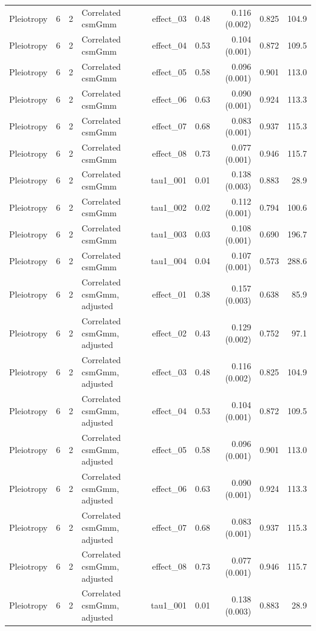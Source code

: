 \begin{longtable}{lcclrrrrr}
Pleiotropy & 6 & 2 & Correlated csmGmm & effect\_03 & 0.48 & 0.116 (0.002) & 0.825 & 104.9\\
Pleiotropy & 6 & 2 & Correlated csmGmm & effect\_04 & 0.53 & 0.104 (0.001) & 0.872 & 109.5\\
Pleiotropy & 6 & 2 & Correlated csmGmm & effect\_05 & 0.58 & 0.096 (0.001) & 0.901 & 113.0\\
Pleiotropy & 6 & 2 & Correlated csmGmm & effect\_06 & 0.63 & 0.090 (0.001) & 0.924 & 113.3\\
Pleiotropy & 6 & 2 & Correlated csmGmm & effect\_07 & 0.68 & 0.083 (0.001) & 0.937 & 115.3\\
Pleiotropy & 6 & 2 & Correlated csmGmm & effect\_08 & 0.73 & 0.077 (0.001) & 0.946 & 115.7\\
Pleiotropy & 6 & 2 & Correlated csmGmm & tau1\_001 & 0.01 & 0.138 (0.003) & 0.883 & 28.9\\
Pleiotropy & 6 & 2 & Correlated csmGmm & tau1\_002 & 0.02 & 0.112 (0.001) & 0.794 & 100.6\\
Pleiotropy & 6 & 2 & Correlated csmGmm & tau1\_003 & 0.03 & 0.108 (0.001) & 0.690 & 196.7\\
Pleiotropy & 6 & 2 & Correlated csmGmm & tau1\_004 & 0.04 & 0.107 (0.001) & 0.573 & 288.6\\
Pleiotropy & 6 & 2 & Correlated csmGmm, adjusted & effect\_01 & 0.38 & 0.157 (0.003) & 0.638 & 85.9\\
Pleiotropy & 6 & 2 & Correlated csmGmm, adjusted & effect\_02 & 0.43 & 0.129 (0.002) & 0.752 & 97.1\\
Pleiotropy & 6 & 2 & Correlated csmGmm, adjusted & effect\_03 & 0.48 & 0.116 (0.002) & 0.825 & 104.9\\
Pleiotropy & 6 & 2 & Correlated csmGmm, adjusted & effect\_04 & 0.53 & 0.104 (0.001) & 0.872 & 109.5\\
Pleiotropy & 6 & 2 & Correlated csmGmm, adjusted & effect\_05 & 0.58 & 0.096 (0.001) & 0.901 & 113.0\\
Pleiotropy & 6 & 2 & Correlated csmGmm, adjusted & effect\_06 & 0.63 & 0.090 (0.001) & 0.924 & 113.3\\
Pleiotropy & 6 & 2 & Correlated csmGmm, adjusted & effect\_07 & 0.68 & 0.083 (0.001) & 0.937 & 115.3\\
Pleiotropy & 6 & 2 & Correlated csmGmm, adjusted & effect\_08 & 0.73 & 0.077 (0.001) & 0.946 & 115.7\\
Pleiotropy & 6 & 2 & Correlated csmGmm, adjusted & tau1\_001 & 0.01 & 0.138 (0.003) & 0.883 & 28.9\\

\end{longtable}
